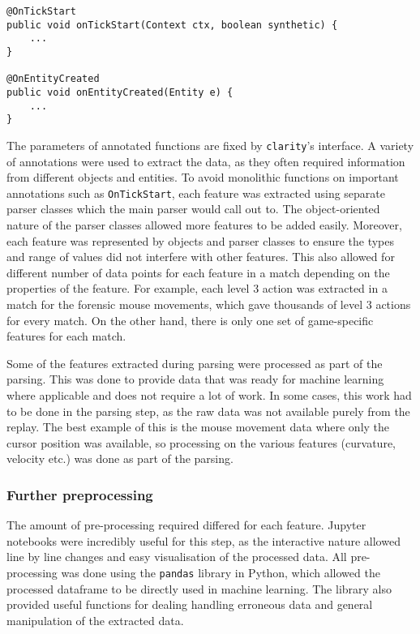 \documentclass[Report.tex]{subfiles}
\begin{document}
\begin{lstlisting}[caption=Annotations and function definitions for parsing must adhere to \texttt{clarity}'s interface.]
@OnTickStart
public void onTickStart(Context ctx, boolean synthetic) {
    ...
}

@OnEntityCreated
public void onEntityCreated(Entity e) {
    ...
}
\end{lstlisting}

The parameters of annotated functions are fixed by \texttt{clarity}'s interface. A variety of annotations were used to extract the data, as they often required information from different objects and entities. To avoid monolithic functions on important annotations such as \texttt{OnTickStart}, each feature was extracted using separate parser classes which the main parser would call out to. The object-oriented nature of the parser classes allowed more features to be added easily. Moreover, each feature was represented by objects and parser classes to ensure the types and range of values did not interfere with other features. This also allowed for different number of data points for each feature in a match depending on the properties of the feature. For example, each level 3 action was extracted in a match for the forensic mouse movements, which gave thousands of level 3 actions for every match. On the other hand, there is only one set of game-specific features for each match.

Some of the features extracted during parsing were processed as part of the parsing. This was done to provide data that was ready for machine learning where applicable and does not require a lot of work. In some cases, this work had to be done in the parsing step, as the raw data was not available purely from the replay. The best example of this is the mouse movement data where only the cursor position was available, so processing on the various features (curvature, velocity etc.) was done as part of the parsing. 

\subsubsection{Further preprocessing}
The amount of pre-processing required differed for each feature. Jupyter notebooks were incredibly useful for this step, as the interactive nature allowed line by line changes and easy visualisation of the processed data. All pre-processing was done using the \texttt{pandas} library in Python, which allowed the processed dataframe to be directly used in machine learning. The library also provided useful functions for dealing handling erroneous data and general manipulation of the extracted data. 
\end{document}
